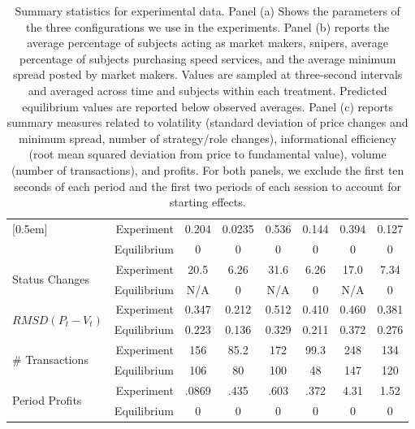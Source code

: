 \documentclass[12pt]{article}
\begin{document}
\begin{table}
{\begin{tabular}{lrcccccc}
                     [0.5em]
\multirow{ 2}{*}{$Std(MinSpread)$  }
						&  Experiment & 0.204 & 0.0235 & 0.536 & 0.144 & 0.394 & 0.127 \\
                     & Equilibrium & 0    & 0 & 0    & 0  & 0    & 0  \\
                     [0.5em]
\multirow{ 2}{*}{Status Changes  }
						& Experiment & 20.5 & 6.26 & 31.6 & 6.26 & 17.0 & 7.34 \\
                     & Equilibrium & N/A   & 0 & N/A    & 0  & N/A    & 0  \\
                     [0.5em]
\multirow{ 2}{*}{$RMSD(P_t-V_t)$ } 
						&  Experiment  & 0.347 & 0.212 & 0.512 & 0.410 & 0.460 & 0.381 \\
                     & Equilibrium & 0.223    & 0.136 & 0.329    & 0.211  & 0.372    & 0.276  \\
                     [0.5em]
\multirow{ 2}{*}{\# Transactions}                         
  					 & Experiment & 156 & 85.2 & 172 & 99.3 & 248 & 134 \\
  					 & Equilibrium & 106 & 80 & 100 & 48 & 147 & 120 \\
                     [0.5em]
\multirow{ 2}{*}{Period Profits} 
                     & Experiment  & .0869 & .435 & .603 & .372 & 4.31 &  1.52 \\
                     & Equilibrium & 0    & 0 & 0    & 0  & 0    & 0  \\
\bottomrule
\end{tabular}
}
\caption{Summary statistics for experimental data. \small Panel (a) Shows the parameters of the three configurations we use in the experiments. Panel (b) reports the average percentage of subjects acting as market makers, snipers, average percentage of subjects purchasing speed services, and the average minimum spread posted by market makers. Values are sampled at three-second intervals and averaged across time and subjects within each treatment. Predicted equilibrium values are reported below observed averages. Panel (c) reports summary measures related to volatility (standard deviation of price changes and minimum spread, number of strategy/role changes), informational efficiency (root mean squared deviation from price to fundamental value),  volume (number of transactions), and profits. For both panels, we exclude the first ten seconds of each period and the first two periods of each session to account for starting effects. \label{tab:Summary}}
\end{table}
\end{document}
